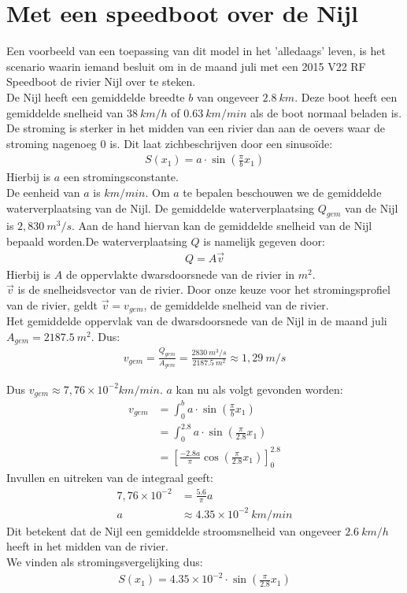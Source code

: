 \section{Met een speedboot over de Nijl}
	Een voorbeeld van een toepassing van dit model in het 'alledaags' leven, is het scenario waarin iemand besluit om in de maand juli met een 2015 V22 RF\cite{een speedboot} Speedboot de rivier Nijl over te steken.\\ De Nijl heeft een gemiddelde breedte \(b\) van ongeveer \(2.8~km\)\cite{Nijlbreedte}.
Deze boot heeft een gemiddelde snelheid van \(38~km/h\) of \(0.63~km/min\) als de boot normaal beladen is.\cite{bootstats}
De stroming is sterker in het midden van een rivier dan aan de oevers waar de stroming nagenoeg \(0\) is.
Dit laat zichbeschrijven door een sinuso\"ide:
\begin{align}
	S(x_1) = a \cdot \sin(\frac{\pi }{b}x_1)
\end{align}
Hierbij is \(a\) een stromingsconstante. \\
De eenheid van \(a\) is \(km/min\).
Om \(a\) te bepalen beschouwen we de gemiddelde waterverplaatsing van de Nijl.
De gemiddelde waterverplaatsing \(Q_{gem}\) van de Nijl is \(2,830~m^3/s\).\cite{Nijlbreedte}
Aan de hand hiervan kan de gemiddelde snelheid van de Nijl bepaald worden.De waterverplaatsing \(Q\) is namelijk gegeven door\cite{Waterverplaatsing}:
\begin{align*}
	Q=A\overrightarrow{v}
\end{align*}
Hierbij is \(A\) de oppervlakte dwarsdoorsnede van de rivier in \(m^2\).\\
\(\overrightarrow{v}\) is de snelheidsvector van de rivier. Door onze keuze voor het stromingsprofiel van de rivier, geldt \(\overrightarrow{v}=v_{gem}\), de gemiddelde snelheid van de rivier.\\
Het gemiddelde oppervlak van de dwarsdoorsnede van de Nijl in de maand juli \(A_{gem} = 2187.5~m^2\).\cite{Nijlstats}
Dus:
\begin{align*}
	v_{gem} = \frac{Q_{gem}}{A_{gem}}=\frac{2830~m^3/s}{2187.5~m^2}\approx 1,29~m/s
\end{align*}

Dus \(v_{gem}\approx 7,76\times 10^{-2} km/min\). \(a\) kan nu als volgt gevonden worden:
\begin{align*}
	v_{gem} &=\int_0^b a \cdot \sin(\frac{\pi }{b}x_1)\\
	&= \int_0^{2.8} a \cdot \sin(\frac{\pi }{2.8}x_1)\\
	&=\left[\frac{-2.8a}{\pi}\cos(\frac{\pi }{2.8}x_1)\right]_0^{2.8}
\end{align*}
Invullen en uitreken van de integraal geeft:
\begin{align*}
	7,76\times 10^{-2} &= \frac{5.6}{\pi}a\\
	a &\approx 4.35\times 10^{-2}~km/min
\end{align*}
Dit betekent dat de Nijl een gemiddelde stroomsnelheid van ongeveer \(2.6~km/h\) heeft in het midden van de rivier.\\
We vinden als stromingsvergelijking dus:
\begin{align}
	S(x_1) = 4.35\times 10^{-2} \cdot \sin(\frac{\pi }{2.8}x_1)
\end{align}

